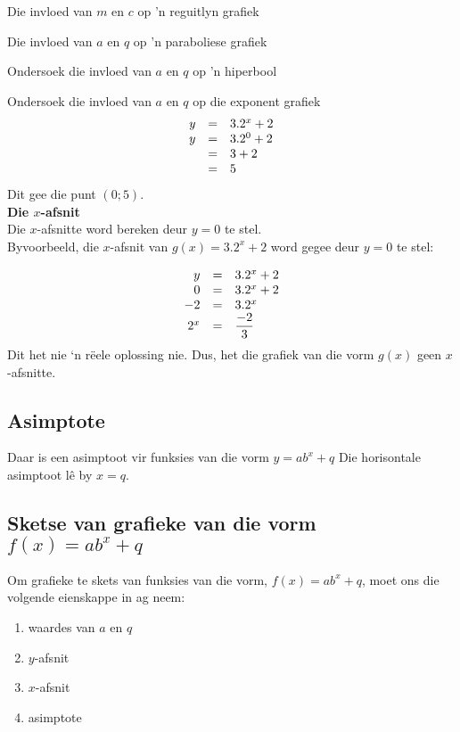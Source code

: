 \begin{Ondersoek}{Die invloed van $m$ en $c$ op 'n reguitlyn grafiek}
\begin{Ondersoek}{Die invloed van $a$ en $q$ op 'n paraboliese grafiek}
\begin{Ondersoek}{Ondersoek die invloed van $a$ en $q$ op 'n hiperbool}
\begin{Ondersoek}{Ondersoek die invloed van $a$ en $q$ op die exponent grafiek}
\begin{equation*}
\begin{array}{ccl}\hfill y& =& 3.2^{x}+2\hfill \\
 \hfill y& =& 3.2^{0}+2\hfill \\
 & =& 3+2\hfill \\ & =& 5\hfill 
\end{array}
\end{equation*}
Dit gee die punt $(0;5)$.\vspace{10pt}
\\
\textbf{Die $x$-afsnit}\\
Die $x$-afsnitte word bereken deur $y=0$ te stel. \\
Byvoorbeeld, die $x$-afsnit van $g(x)=3.2^{x}+2$ word gegee deur $y=0$ te stel:\par 
\begin{equation*}
\begin{array}{ccl}\hfill y& =& 3.2^{x}+2\hfill \\
 \hfill 0& =& 3.2^{x}+2\hfill \\
 \hfill -2& =& 3.2^{x}\hfill \\
 \hfill {2}^{x}& =& \dfrac{-2}{3}\hfill 
\end{array}
\end{equation*}
Dit het nie ‘n rëele oplossing nie. Dus, het die grafiek van die vorm $g(x)$ geen $x$-afsnitte.\par 

\subsection*{Asimptote}

Daar is een asimptoot vir funksies van die vorm $y=ab^{x}+q$  Die horisontale asimptoot lê by $x=q$. 


\subsection*{Sketse van grafieke van die vorm $f(x)=ab^{x}+q$}

Om grafieke te skets van funksies van die vorm, $f(x)=ab^{x}+q$, moet ons die volgende eienskappe in ag neem:\par 
\begin{enumerate}[noitemsep, label=\textbf{\arabic*}. ] 
\item waardes van $a$ en $q$
\item $y$-afsnit
\item $x$-afsnit
\item asimptote
\end{enumerate}


\end{Ondersoek}
\end{Ondersoek}
\end{Ondersoek}
\end{Ondersoek}
